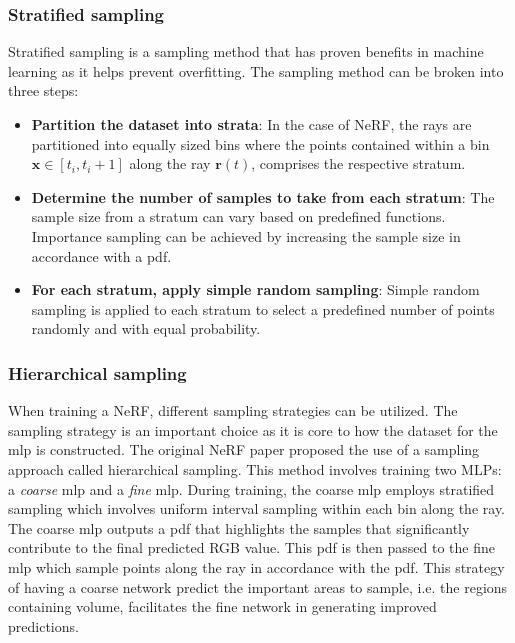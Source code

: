 \subsubsection{Stratified sampling} \label{sec:stratifiedsampling}
Stratified sampling is a sampling method that has proven benefits in machine learning as it helps prevent overfitting. The sampling method can be broken into three steps:

\begin{itemize}
    \item \textbf{Partition the dataset into strata}: In the case of NeRF, the rays are partitioned into equally sized bins where the points contained within a bin $\pmb{x} \in [t_i, t_i+1]$ along the ray $\pmb{r}(t)$, comprises the respective stratum.
    \item \textbf{Determine the number of samples to take from each stratum}: The sample size from a stratum can vary based on predefined functions. Importance sampling can be achieved by increasing the sample size in accordance with a \acrshort{pdf}.
    \item \textbf{For each stratum, apply simple random sampling}: Simple random sampling is applied to each stratum to select a predefined number of points randomly and with equal probability.
\end{itemize}



\subsubsection{Hierarchical sampling} \label{sec:hierarchicalsampling}
When training a NeRF, different sampling strategies can be utilized. The sampling strategy is an important choice as it is core to how the dataset for the \acrshort{mlp} is constructed. The original NeRF paper \cite{mildenhall_nerf_2020} proposed the use of a sampling approach called hierarchical sampling. This method involves training two MLPs: a \textit{coarse} \acrshort{mlp} and a \textit{fine} \acrshort{mlp}. During training, the coarse \acrshort{mlp} employs stratified sampling which involves uniform interval sampling within each bin along the ray. The coarse \acrshort{mlp} outputs a \acrfull{pdf} that highlights the samples that significantly contribute to the final predicted RGB value. This \acrshort{pdf} is then passed to the fine \acrshort{mlp} which sample points along the ray in accordance with the \acrshort{pdf}. This strategy of having a coarse network predict the important areas to sample, i.e. the regions containing volume, facilitates the fine network in generating improved predictions.

